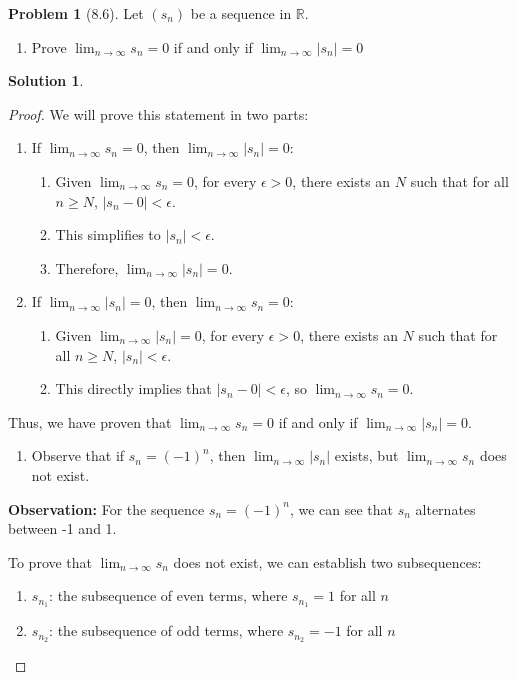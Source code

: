 \documentclass[12pt]{article}
\theoremstyle{definition} %
\newtheorem{solution}{Solution}
\newtheorem{problem}{Problem}
\theoremstyle{plain} %
\begin{document}
\begin{problem}[8.6]
    Let $(s_{n})$ be a sequence in $\mathbb{R}$.
\begin{enumerate}
    \item Prove $\lim_{ n \to \infty }s_{n}=0$ if and only if $\lim_{ n \to \infty }|s_{n}|=0$
\end{enumerate}

\end{problem}

\begin{solution}
   \begin{proof}
    We will prove this statement in two parts:
\begin{enumerate}
    \item If $\lim_{n \to \infty} s_n = 0$, then $\lim_{n \to \infty} |s_n| = 0$:
    \begin{enumerate}
        \item Given $\lim_{n \to \infty} s_n = 0$, for every $\epsilon > 0$, there exists an $N$ such that for all $n \geq N$, $|s_n - 0| < \epsilon$.
        \item This simplifies to $|s_n| < \epsilon$.
        \item Therefore, $\lim_{n \to \infty} |s_n| = 0$.
    \end{enumerate}
    \item If $\lim_{n \to \infty} |s_n| = 0$, then $\lim_{n \to \infty} s_n = 0$:
    \begin{enumerate}
        \item Given $\lim_{n \to \infty} |s_n| = 0$, for every $\epsilon > 0$, there exists an $N$ such that for all $n \geq N$, $|s_n| < \epsilon$.
        \item This directly implies that $|s_n - 0| < \epsilon$, so $\lim_{n \to \infty} s_n = 0$.
    \end{enumerate}
\end{enumerate}
Thus, we have proven that $\lim_{n \to \infty} s_n = 0$ if and only if $\lim_{n \to \infty} |s_n| = 0$. 

\begin{enumerate}[resume]
    \item Observe that if $s_{n}=(-1)^n$, then $\lim_{ n \to \infty }|s_{n}|$ exists, but $\lim_{ n \to \infty }s_{n}$ does not exist.
\end{enumerate}

\textbf{Observation:} For the sequence $s_n = (-1)^n$, we can see that $s_n$ alternates between -1 and 1.

To prove that $\lim_{n \to \infty} s_n$ does not exist, we can establish two subsequences:
\begin{enumerate}
    \item $s_{n_1}$: the subsequence of even terms, where $s_{n_1} = 1$ for all $n$
    \item $s_{n_2}$: the subsequence of odd terms, where $s_{n_2} = -1$ for all $n$
\end{enumerate}


\end{proof}
\end{solution}
\end{document}
